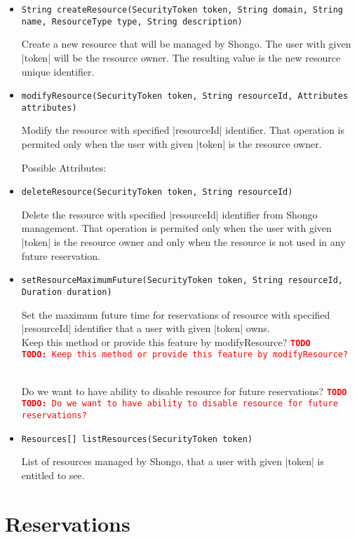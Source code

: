\documentclass[a4paper]{report}
\newcommand{\APIcmd}[1]{%
\item \lstinline[style=myinline]!#1!%

}
\newenvironment{APIdef}{\begin{itemize}}{\end{itemize}}
\newcommand{\TODO}[1]{%
\def\empty{}%
\def\prvniparametr{#1}%
\ifx\prvniparametr\empty%
\begingroup\tt\textcolor{red}{\noindent\textbf{TODO}}\endgroup
\else%
\begingroup\tt\textcolor{red}{\noindent\textbf{TODO:}\ #1}\endgroup
\fi%
}
\begin{document}
\begin{APIdef}

\APIcmd{String createResource(SecurityToken token, String domain, String name, ResourceType type, String description)}
Create a new resource that will be managed by Shongo. The user with given |token| will be the resource owner. The resulting value is the new resource unique identifier.

\APIcmd{modifyResource(SecurityToken token, String resourceId, Attributes attributes)}
Modify the resource with specified |resourceId| identifier. That operation is permited only when the user with given |token| is the resource owner.

Possible Attributes:

\APIcmd{deleteResource(SecurityToken token, String resourceId)}
Delete the resource with specified |resourceId| identifier from Shongo management. That operation is permited only when the user with given |token| is the resource owner and only when the resource is not used in any future reservation.

\APIcmd{setResourceMaximumFuture(SecurityToken token, String resourceId, Duration duration)}
Set the maximum future time for reservations of resource with specified |resourceId| identifier that a user with given |token| owns.
\\ \TODO{Keep this method or provide this feature by modifyResource?}
\\ \TODO{Do we want to have ability to disable resource for future reservations?}

\APIcmd{Resources[] listResources(SecurityToken token)}
List of resources managed by Shongo, that a user with given |token| is entitled to see.

\end{APIdef}


\section{Reservations}
\end{document}
